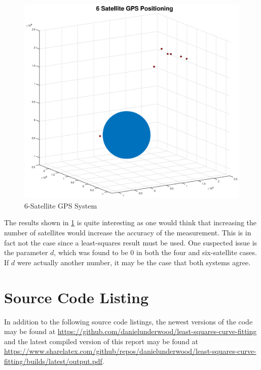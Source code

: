 \documentclass[10pt,a4paper]{article}
\begin{document}
\begin{figure}[H]
\includegraphics[width=\linewidth]{Figures/6satgps.eps}
\caption{6-Satellite GPS System}
\label{fig: 6satgps}
\end{figure}

The results shown in \cref{fig: 6satgps} is quite interesting as one would think that increasing the number of satellites would increase the accuracy of the measurement. This is in fact not the case since a least-squares result must be used. One suspected issue is the parameter $d$, which was found to be 0 in both the four and six-satellite cases. If $d$ were actually another number, it may be the case that both systems agree.

\newpage

\section*{Source Code Listing}

In addition to the following source code listings, the newest versions of the code may be found at \url{https://github.com/danielunderwood/least-squares-curve-fitting} and the latest compiled version of this report may be found at \url{https://www.sharelatex.com/github/repos/danielunderwood/least-squares-curve-fitting/builds/latest/output.pdf}.




\end{document}
